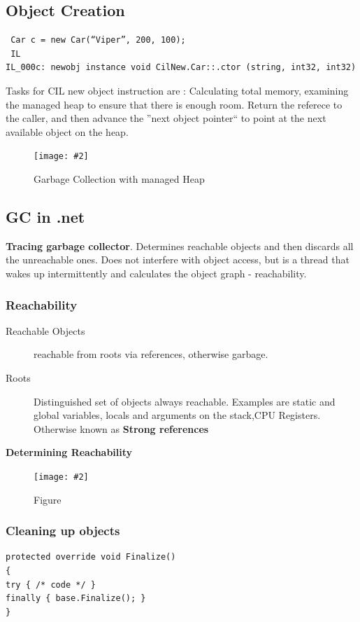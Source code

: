 \documentclass[a4paper,10pt]{scrartcl}
\newcommand{\pic}[2][Figure]{
  \begin{figure}[h!]
   \centering
   \texttt{[image: \#2]}
   \caption{{#1}}
  \end{figure}
}
\begin{document}
\subsection{Object Creation}
\begin{lstlisting}
 Car c = new Car(“Viper”, 200, 100);
 IL
IL_000c: newobj instance void CilNew.Car::.ctor (string, int32, int32)

\end{lstlisting}

Tasks for CIL new object instruction are : Calculating total memory, examining the managed heap to ensure that there is enough room.
Return the referece to the caller, and then advance the ''next object pointer`` to point at the next available object on the heap.
\pic[Garbage Collection with managed Heap]{gc1.png}

\subsection{GC in .net}
\textbf{Tracing garbage collector}. Determines reachable objects and then discards all the unreachable ones. 
Does not interfere with object access, but is a thread that wakes up intermittently and calculates the object graph - reachability.

\subsubsection{Reachability}
\begin{description}
 \item [Reachable Objects] reachable from roots via references, otherwise garbage.
 \item [Roots] Distinguished set of objects always reachable. Examples are static and global variables, locals and arguments on the stack,CPU Registers. Otherwise known as \textbf{Strong references}
\end{description}

\textbf{Determining Reachability}
\pic{reachability.png}

\subsubsection{Cleaning up objects}
\begin{lstlisting}[caption=c\# finalise]
 protected override void Finalize()
{
try { /* code */ }
finally { base.Finalize(); }
}

\end{lstlisting}
\end{document}
